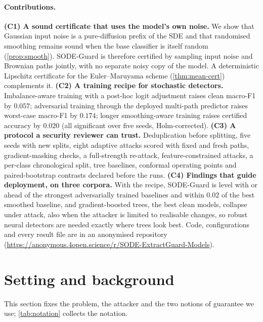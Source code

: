 \documentclass{article}
\newcommand{\anonrepo}{\url{https://anonymous.4open.science/r/SODE-ExtractGuard-Models}}
\theoremstyle{definition}
\begin{document}
\paragraph{Contributions.}
\textbf{(C1) A sound certificate that uses the model's own noise.} We show that
Gaussian input noise is a pure-diffusion prefix of the SDE and that randomised
smoothing remains sound when the base classifier is itself random
(\cref{prop:smooth}). SODE-Guard is therefore certified by sampling input noise
and Brownian paths jointly, with no separate noisy copy of the model. A
deterministic Lipschitz certificate for the Euler--Maruyama scheme
(\cref{thm:mean-cert}) complements it.
\textbf{(C2) A training recipe for stochastic detectors.} Imbalance-aware
training with a post-hoc logit adjustment raises clean macro-F1 by $0.057$;
adversarial training through the deployed multi-path predictor raises
worst-case macro-F1 by $0.174$; longer smoothing-aware training raises
certified accuracy by $0.020$ (all significant over five seeds, Holm-corrected).
\textbf{(C3) A protocol a security reviewer can trust.} Deduplication before
splitting, five seeds with new splits, eight adaptive attacks scored with
fixed and fresh paths, gradient-masking checks, a full-strength re-attack,
feature-constrained attacks, a per-class chronological split, tree baselines,
conformal operating points and paired-bootstrap contrasts declared before the
runs.
\textbf{(C4) Findings that guide deployment, on three corpora.} With the recipe,
SODE-Guard is level with or ahead of the strongest adversarially trained
baselines and within $0.02$ of the best smoothed baseline, and
gradient-boosted trees, the best clean models, collapse under attack, also when
the attacker is limited to realisable changes, so robust neural detectors are
needed exactly where trees look best.
Code, configurations and every result file are in an anonymised repository
(\anonrepo).

\section{Setting and background}\label{sec:setting}
This section fixes the problem, the attacker and the two notions of
guarantee we use; \cref{tab:notation} collects the notation.
\end{document}
